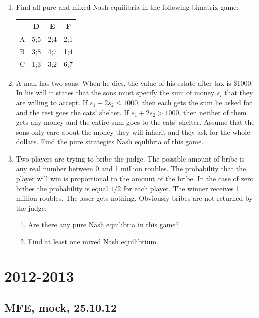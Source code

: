 \documentclass[12pt]{article} %
\theoremstyle{definition} %
\begin{document}
\begin{enumerate}[resume]
\item Find all pure and mixed Nash equilibria in the following bimatrix game:


\begin{tabular}{c|ccc}
 & D & E & F \\
\hline
A & 5;5 & 2;4 & 2;1  \\
B & 3;8 & 4;7 & 1;4  \\
C & 1;3 & 3;2 & 6;7  \\
\end{tabular}
\item A man has two sons. When he dies, the value of his estate after tax is \$1000. In his will it states that the sons must specify the sum of money $s_i$ that they are willing to accept. If $s_1+2s_2\leq 1000$, then each gets the sum he asked for and the rest goes the cats’ shelter. If $s_1+2s_2> 1000$, then neither of them gets any money and the entire sum goes to the cats’ shelter. Assume that the sons only care about the money they will inherit and they ask for the whole dollars. Find the pure strategies Nash equlibria of this game.

\item Two players are trying to bribe the judge. The possible amount of bribe is any real number between 0 and 1 million roubles. The probability that the player will win is proportional to the amount of the bribe. In the case of zero bribes the probability is equal $1/2$ for each player. The winner receives 1 million roubles. The loser gets nothing. Obviously bribes are not returned by the judge.
\begin{enumerate}
\item Are there any pure Nash equilibria in this game?
\item Find at least one mixed Nash equilibrium.
\end{enumerate}

\end{enumerate}




\section{2012-2013}

\subsection{MFE, mock, 25.10.12}

\end{document}
